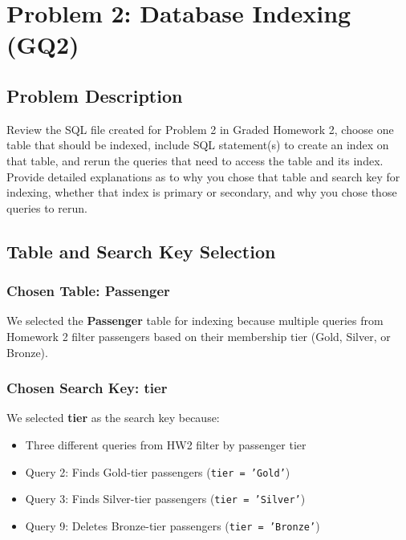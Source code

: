 \documentclass[12pt]{article}
\begin{document}
\tableofcontents
\newpage

\section{Problem 2: Database Indexing (GQ2)}

\subsection{Problem Description}

Review the SQL file created for Problem 2 in Graded Homework 2, choose one table that should be indexed, include SQL statement(s) to create an index on that table, and rerun the queries that need to access the table and its index. Provide detailed explanations as to why you chose that table and search key for indexing, whether that index is primary or secondary, and why you chose those queries to rerun.

\subsection{Table and Search Key Selection}

\subsubsection{Chosen Table: Passenger}

We selected the \textbf{Passenger} table for indexing because multiple queries from Homework 2 filter passengers based on their membership tier (Gold, Silver, or Bronze).

\subsubsection{Chosen Search Key: tier}

We selected \textbf{tier} as the search key because:

\begin{itemize}
    \item Three different queries from HW2 filter by passenger tier
    \item Query 2: Finds Gold-tier passengers (\texttt{tier = 'Gold'})
    \item Query 3: Finds Silver-tier passengers (\texttt{tier = 'Silver'})
    \item Query 9: Deletes Bronze-tier passengers (\texttt{tier = 'Bronze'})
\end{itemize}
\end{document}
